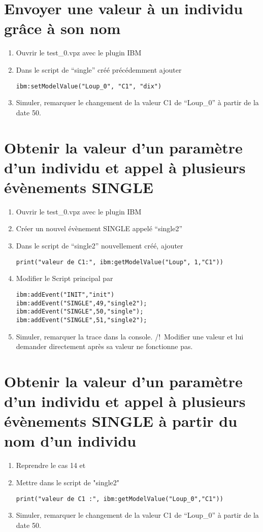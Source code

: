 \documentclass[a4paper,11pt,final]{article}
\begin{document}
\section{Envoyer une valeur à un individu grâce à son nom}
\begin{enumerate}
\item Ouvrir le test\_0.vpz avec le plugin IBM
\item Dans le script de ``single'' créé précédemment ajouter 
\begin{lstlisting}[frame=single]
ibm:setModelValue("Loup_0", "C1", "dix")
	\end{lstlisting} 
\item Simuler, remarquer le changement de la valeur C1 de ``Loup\_0'' à partir de la date 50.
\end{enumerate}

\section{Obtenir la valeur d'un paramètre d'un individu et appel à plusieurs évènements SINGLE}
\begin{enumerate}
\item Ouvrir le test\_0.vpz avec le plugin IBM
\item Créer un nouvel évènement SINGLE appelé ``single2''
\item Dans le script de ``single2'' nouvellement créé, ajouter
\begin{lstlisting}[frame=single]
print("valeur de C1:", ibm:getModelValue("Loup", 1,"C1"))
	\end{lstlisting} 
\item Modifier le Script principal par
\begin{lstlisting}[frame=single]
ibm:addEvent("INIT","init")
ibm:addEvent("SINGLE",49,"single2");
ibm:addEvent("SINGLE",50,"single");
ibm:addEvent("SINGLE",51,"single2");
	\end{lstlisting} 
\item Simuler, remarquer la trace dans la console. /!\ Modifier une valeur et lui demander directement après sa valeur ne fonctionne pas.
\end{enumerate}

\section{Obtenir la valeur d'un paramètre d'un individu et appel à plusieurs évènements SINGLE à partir du nom d'un individu}
\begin{enumerate}
\item Reprendre le cas 14 et  
\item Mettre dans le script de "single2"
\begin{lstlisting}[frame=single]
print("valeur de C1 :", ibm:getModelValue("Loup_0","C1"))
	\end{lstlisting} 
\item Simuler, remarquer le changement de la valeur C1 de ``Loup\_0'' à partir de la date 50.
\end{enumerate}
\end{document}
